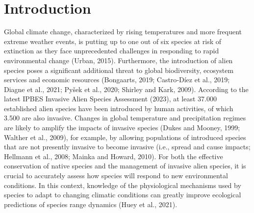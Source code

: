 \documentclass[10pt, twoside]{book} %
\begin{document}
\section{Introduction}
Global climate change, characterized by rising temperatures and more frequent extreme weather events, is putting up to one out of six species at risk of extinction as they face unprecedented challenges in responding to rapid environmental change (Urban, 2015). Furthermore, the introduction of alien species poses a significant additional threat to global biodiversity, ecosystem services and economic resources (Bongaarts, 2019; Castro‐Díez et al., 2019; Diagne et al., 2021; Pyšek et al., 2020; Shirley and Kark, 2009). According to the latest IPBES Invasive Alien Species Assessment (2023), at least 37.000 established alien species have been introduced by human activities, of which 3.500 are also invasive. Changes in global temperature and precipitation regimes are likely to amplify the impacts of invasive species (Dukes and Mooney, 1999; Walther et al., 2009), for example, by allowing populations of introduced species that are not presently invasive to become invasive (i.e., spread and cause impacts; Hellmann et al., 2008; Mainka and Howard, 2010). For both the effective conservation of native species and the management of invasive alien species, it is crucial to accurately assess how species will respond to new environmental conditions. In this context, knowledge of the physiological mechanisms used by species to adapt to changing climatic conditions can greatly improve ecological predictions of species range dynamics (Huey et al., 2021).\\
\end{document}
